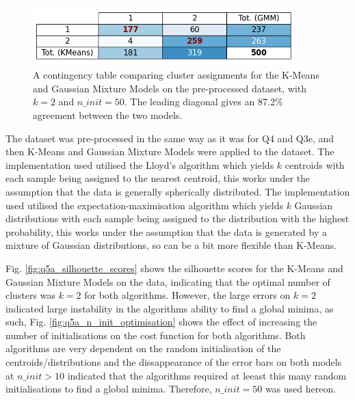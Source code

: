     \begin{figure}[htb]
    \centering
    \includegraphics[width=0.9\textwidth]{./figures/q5a_contingency_table}
    \caption{A contingency table comparing cluster assignments for the K-Means and Gaussian Mixture Models on the
        pre-processed  dataset, with $k=2$ and $n\_init=50$. The leading diagonal
        gives an 87.2\% agreement between the two models.}
    \label{fig:q5a_contingency_table}
    \end{figure}

    The dataset  was pre-processed in the same way as it was for Q4 and Q3e, and
    then K-Means and Gaussian Mixture Models were applied to the dataset.
    The  implementation used utilised the Lloyd's algorithm which yields $k$ centroids with each
    sample being assigned to the nearest centroid, this works under the assumption that the data is generally spherically
    distributed.
    The  implementation used utilised the expectation-maximisation algorithm which yields $k$
    Gaussian distributions with each sample being assigned to the distribution with the highest probability, this works
    under the assumption that the data is generated by a mixture of Gaussian distributions, so can be a bit more flexible
    than K-Means.

    Fig. \ref{fig:q5a_silhouette_scores} shows the silhouette scores for the K-Means and Gaussian Mixture Models on the
    data, indicating that the optimal number of clusters was $k=2$ for both algorithms.
    However, the large errors on $k=2$ indicated large instability in the algorithms ability to find a global minima,
    as such, Fig. \ref{fig:q5a_n_init_optimisation} shows the effect of increasing the number of initialisations on the
    cost function for both algorithms.
    Both algorithms are very dependent on the random initialisation of the centroids/distributions and the dissappearance
    of the error bars on both models at $n\_init > 10$ indicated that the algorithms required at leeast this many random
    initialisations to find a global minima.
    Therefore, $n\_init=50$ was used hereon.

